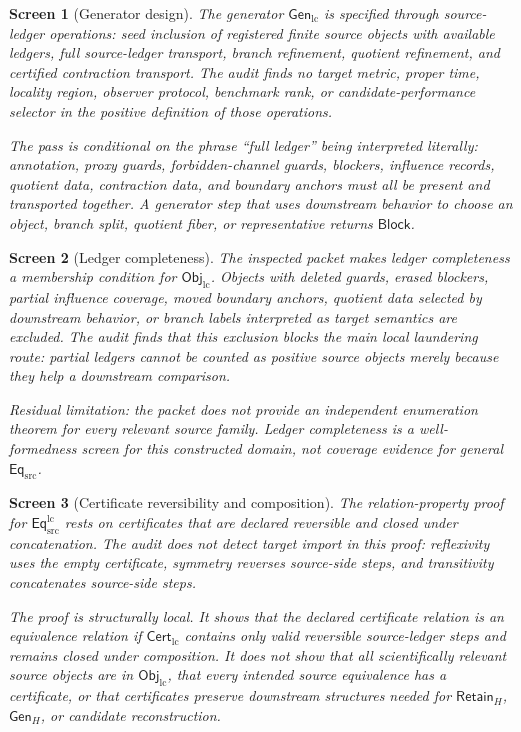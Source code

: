\documentclass[11pt]{article}
\newcommand{\EqSrc}{\mathsf{Eq}_{\mathrm{src}}}
\newcommand{\EqLC}{\mathsf{Eq}_{\mathrm{src}}^{\mathrm{lc}}}
\newcommand{\ObjLC}{\mathsf{Obj}_{\mathrm{lc}}}
\newcommand{\GenLC}{\mathsf{Gen}_{\mathrm{lc}}}
\newcommand{\CertLC}{\mathsf{Cert}_{\mathrm{lc}}}
\newcommand{\RetainH}{\mathsf{Retain}_{H}}
\newcommand{\GenH}{\mathsf{Gen}_{H}}
\newcommand{\Block}{\mathsf{Block}}
\newtheorem{screen}{Screen}
\begin{document}
\begin{screen}[Generator design]
The generator \(\GenLC\) is specified through source-ledger operations:
seed inclusion of registered finite source objects with available
ledgers, full source-ledger transport, branch refinement, quotient
refinement, and certified contraction transport. The audit finds no
target metric, proper time, locality region, observer protocol,
benchmark rank, or candidate-performance selector in the positive
definition of those operations.

The pass is conditional on the phrase ``full ledger'' being interpreted
literally: annotation, proxy guards, forbidden-channel guards, blockers,
influence records, quotient data, contraction data, and boundary anchors
must all be present and transported together. A generator step that uses
downstream behavior to choose an object, branch split, quotient fiber, or
representative returns \(\Block\).
\end{screen}

\begin{screen}[Ledger completeness]
The inspected packet makes ledger completeness a membership condition
for \(\ObjLC\). Objects with deleted guards, erased blockers, partial
influence coverage, moved boundary anchors, quotient data selected by
downstream behavior, or branch labels interpreted as target semantics are
excluded. The audit finds that this exclusion blocks the main local
laundering route: partial ledgers cannot be counted as positive source
objects merely because they help a downstream comparison.

Residual limitation: the packet does not provide an independent
enumeration theorem for every relevant source family. Ledger completeness
is a well-formedness screen for this constructed domain, not coverage
evidence for general \(\EqSrc\).
\end{screen}

\begin{screen}[Certificate reversibility and composition]
The relation-property proof for \(\EqLC\) rests on certificates that are
declared reversible and closed under concatenation. The audit does not
detect target import in this proof: reflexivity uses the empty
certificate, symmetry reverses source-side steps, and transitivity
concatenates source-side steps.

The proof is structurally local. It shows that the declared certificate
relation is an equivalence relation if \(\CertLC\) contains only valid
reversible source-ledger steps and remains closed under composition. It
does not show that all scientifically relevant source objects are in
\(\ObjLC\), that every intended source equivalence has a certificate, or
that certificates preserve downstream structures needed for
\(\RetainH\), \(\GenH\), or candidate reconstruction.
\end{screen}
\end{document}

